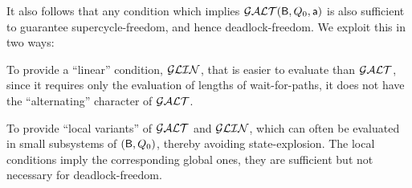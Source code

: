It also follows that any condition which implies $\mathcal{GALT}(\mathsf{B}, Q_0, \mathsf{a})$ is also sufficient to guarantee  supercycle-freedom, and
hence deadlock-freedom. We exploit this in two ways:
\bn

\item To provide a ``linear'' condition, $\mathcal{GLIN}$, that is easier to evaluate than $\mathcal{GALT}$, since it requires only the
evaluation of lengths of wait-for-paths, \ie it does not have the ``alternating'' character of $\mathcal{GALT}$. 

\item To provide ``local variants'' of $\mathcal{GALT}$ and $\mathcal{GLIN}$,  which can often be
evaluated in small subsystems of $(\mathsf{B}, Q_0)$, thereby avoiding state-explosion. The local conditions imply the
corresponding global ones, \ie they are sufficient but not necessary for deadlock-freedom.

\en
